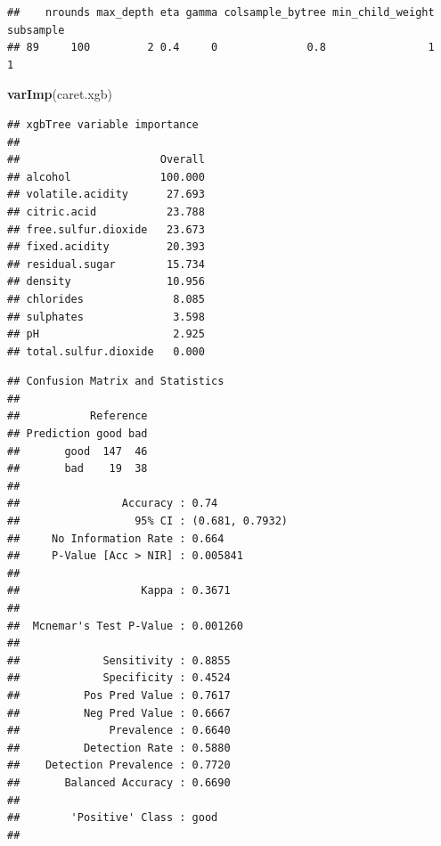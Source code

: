 \documentclass[
  spanish,
]{book}
\newenvironment{Shaded}{\begin{snugshade}}{\end{snugshade}}
\newcommand{\DataTypeTok}[1]{\textcolor[rgb]{0.13,0.29,0.53}{#1}}
\newcommand{\KeywordTok}[1]{\textcolor[rgb]{0.13,0.29,0.53}{\textbf{#1}}}
\newcommand{\NormalTok}[1]{#1}
\newcommand{\OperatorTok}[1]{\textcolor[rgb]{0.81,0.36,0.00}{\textbf{#1}}}
\theoremstyle{break}
\theoremstyle{definition}
\theoremstyle{definition}
\theoremstyle{definition}
\theoremstyle{remark}
\begin{document}
\begin{verbatim}
##    nrounds max_depth eta gamma colsample_bytree min_child_weight subsample
## 89     100         2 0.4     0              0.8                1         1
\end{verbatim}

\begin{Shaded}
\begin{Highlighting}[]
\KeywordTok{varImp}\NormalTok{(caret.xgb)}
\end{Highlighting}
\end{Shaded}

\begin{verbatim}
## xgbTree variable importance
## 
##                      Overall
## alcohol              100.000
## volatile.acidity      27.693
## citric.acid           23.788
## free.sulfur.dioxide   23.673
## fixed.acidity         20.393
## residual.sugar        15.734
## density               10.956
## chlorides              8.085
## sulphates              3.598
## pH                     2.925
## total.sulfur.dioxide   0.000
\end{verbatim}

\begin{Shaded}
\end{Shaded}

\begin{verbatim}
## Confusion Matrix and Statistics
## 
##           Reference
## Prediction good bad
##       good  147  46
##       bad    19  38
##                                          
##                Accuracy : 0.74           
##                  95% CI : (0.681, 0.7932)
##     No Information Rate : 0.664          
##     P-Value [Acc > NIR] : 0.005841       
##                                          
##                   Kappa : 0.3671         
##                                          
##  Mcnemar's Test P-Value : 0.001260       
##                                          
##             Sensitivity : 0.8855         
##             Specificity : 0.4524         
##          Pos Pred Value : 0.7617         
##          Neg Pred Value : 0.6667         
##              Prevalence : 0.6640         
##          Detection Rate : 0.5880         
##    Detection Prevalence : 0.7720         
##       Balanced Accuracy : 0.6690         
##                                          
##        'Positive' Class : good           
## 
\end{verbatim}
\end{document}
